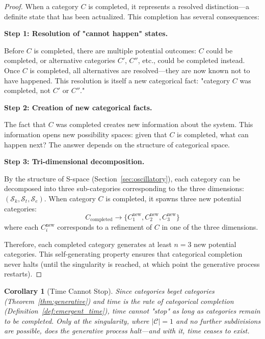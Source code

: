 \documentclass[12pt,a4paper]{article}
\newtheorem{corollary}[theorem]{Corollary}
\theoremstyle{definition}
\theoremstyle{remark}
\newcommand{\Sentropy}{\mathcal{S}}
\begin{document}
\begin{proof}
When a category $C$ is completed, it represents a resolved distinction—a definite state that has been actualized. This completion has several consequences:

\textbf{Step 1: Resolution of "cannot happen" states.}

Before $C$ is completed, there are multiple potential outcomes: $C$ could be completed, or alternative categories $C'$, $C''$, etc., could be completed instead. Once $C$ is completed, all alternatives are resolved—they are now known not to have happened. This resolution is itself a new categorical fact: "category $C$ was completed, not $C'$ or $C''$."

\textbf{Step 2: Creation of new categorical facts.}

The fact that $C$ was completed creates new information about the system. This information opens new possibility spaces: given that $C$ is completed, what can happen next? The answer depends on the structure of categorical space.

\textbf{Step 3: Tri-dimensional decomposition.}

By the structure of S-space (Section~\ref{sec:oscillatory}), each category can be decomposed into three sub-categories corresponding to the three dimensions: $(\Sentropy_k, \Sentropy_t, \Sentropy_e)$. When category $C$ is completed, it spawns three new potential categories:
\begin{equation}
C_{\text{completed}} \to \{C_1^{\text{new}}, C_2^{\text{new}}, C_3^{\text{new}}\}
\end{equation}
where each $C_i^{\text{new}}$ corresponds to a refinement of $C$ in one of the three dimensions.

Therefore, each completed category generates at least $n = 3$ new potential categories. This self-generating property ensures that categorical completion never halts (until the singularity is reached, at which point the generative process restarts).
\end{proof}

\begin{corollary}[Time Cannot Stop]
\label{cor:time_cannot_stop}
Since categories beget categories (Theorem~\ref{thm:generative}) and time is the rate of categorical completion (Definition~\ref{def:emergent_time}), time cannot "stop" as long as categories remain to be completed. Only at the singularity, where $|\mathcal{C}| = 1$ and no further subdivisions are possible, does the generative process halt—and with it, time ceases to exist.
\end{corollary}
\end{document}
